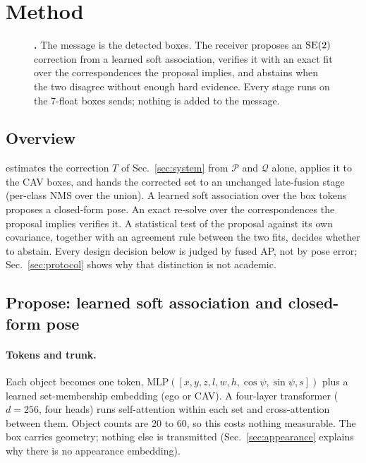 \section{Method}
\label{sec:method}

\begin{figure}[t]
  \centering
  
  \caption{\textbf{\paper.} The message is the detected boxes. The receiver proposes an $\mathrm{SE}(2)$ correction from a learned soft association, verifies it with an exact fit over the correspondences the proposal implies, and abstains when the two disagree without enough hard evidence. Every stage runs on the 7-float boxes \freealign sends; nothing is added to the message.}
  \label{fig:method}
\end{figure}

\subsection{Overview}
\label{sec:problem}
\paper estimates the correction $T$ of Sec.~\ref{sec:system} from $\mathcal{P}$ and $\mathcal{Q}$ alone, applies it to the CAV boxes, and hands the corrected set to an unchanged late-fusion stage (per-class NMS over the union). A learned soft association over the box tokens proposes a closed-form pose. An exact re-solve over the correspondences the proposal implies verifies it. A statistical test of the proposal against its own covariance, together with an agreement rule between the two fits, decides whether to abstain. Every design decision below is judged by fused AP, not by pose error; Sec.~\ref{sec:protocol} shows why that distinction is not academic.

\subsection{Propose: learned soft association and closed-form pose}
\label{sec:propose}
\paragraph{Tokens and trunk.}
Each object becomes one token, $\mathrm{MLP}([x,y,z,l,w,h,\cos\psi,\sin\psi,s])$ plus a learned set-membership embedding (ego or CAV). A four-layer transformer ($d=256$, four heads) runs self-attention within each set and cross-attention between them. Object counts are 20 to 60, so this costs nothing measurable. The box carries geometry; nothing else is transmitted (Sec.~\ref{sec:appearance} explains why there is no appearance embedding).

